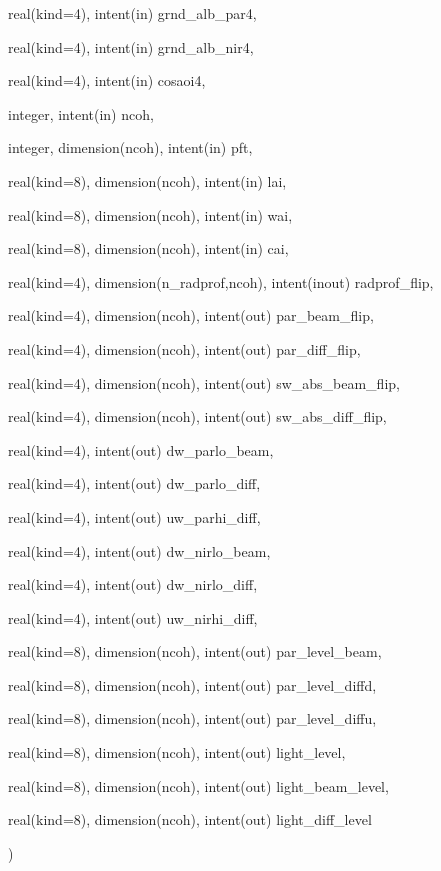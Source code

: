 {\begin{DoxyParamCaption}
\item[{real(kind=4), intent(in)}]{grnd\+\_\+alb\+\_\+par4, }
\item[{real(kind=4), intent(in)}]{grnd\+\_\+alb\+\_\+nir4, }
\item[{real(kind=4), intent(in)}]{cosaoi4, }
\item[{integer, intent(in)}]{ncoh, }
\item[{integer, dimension(ncoh), intent(in)}]{pft, }
\item[{real(kind=8), dimension(ncoh), intent(in)}]{lai, }
\item[{real(kind=8), dimension(ncoh), intent(in)}]{wai, }
\item[{real(kind=8), dimension(ncoh), intent(in)}]{cai, }
\item[{real(kind=4), dimension(n\+\_\+radprof,ncoh), intent(inout)}]{radprof\+\_\+flip, }
\item[{real(kind=4), dimension(ncoh), intent(out)}]{par\+\_\+beam\+\_\+flip, }
\item[{real(kind=4), dimension(ncoh), intent(out)}]{par\+\_\+diff\+\_\+flip, }
\item[{real(kind=4), dimension(ncoh), intent(out)}]{sw\+\_\+abs\+\_\+beam\+\_\+flip, }
\item[{real(kind=4), dimension(ncoh), intent(out)}]{sw\+\_\+abs\+\_\+diff\+\_\+flip, }
\item[{real(kind=4), intent(out)}]{dw\+\_\+parlo\+\_\+beam, }
\item[{real(kind=4), intent(out)}]{dw\+\_\+parlo\+\_\+diff, }
\item[{real(kind=4), intent(out)}]{uw\+\_\+parhi\+\_\+diff, }
\item[{real(kind=4), intent(out)}]{dw\+\_\+nirlo\+\_\+beam, }
\item[{real(kind=4), intent(out)}]{dw\+\_\+nirlo\+\_\+diff, }
\item[{real(kind=4), intent(out)}]{uw\+\_\+nirhi\+\_\+diff, }
\item[{real(kind=8), dimension(ncoh), intent(out)}]{par\+\_\+level\+\_\+beam, }
\item[{real(kind=8), dimension(ncoh), intent(out)}]{par\+\_\+level\+\_\+diffd, }
\item[{real(kind=8), dimension(ncoh), intent(out)}]{par\+\_\+level\+\_\+diffu, }
\item[{real(kind=8), dimension(ncoh), intent(out)}]{light\+\_\+level, }
\item[{real(kind=8), dimension(ncoh), intent(out)}]{light\+\_\+beam\+\_\+level, }
\item[{real(kind=8), dimension(ncoh), intent(out)}]{light\+\_\+diff\+\_\+level}
\end{DoxyParamCaption}
)}\hypertarget{twostream__rad_8f90_abe93885fe642dcef8db1fb3977179585}{}\label{twostream__rad_8f90_abe93885fe642dcef8db1fb3977179585}


